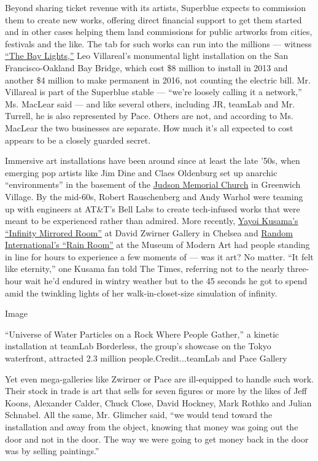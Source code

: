 Beyond sharing ticket revenue with its artists, Superblue expects to
commission them to create new works, offering direct financial support
to get them started and in other cases helping them land commissions for
public artworks from cities, festivals and the like. The tab for such
works can run into the millions --- witness
\href{https://illuminate.org/projects/the-bay-lights/}{``The Bay
Lights,''} Leo Villareal's monumental light installation on the San
Francisco-Oakland Bay Bridge, which cost \$8 million to install in 2013
and another \$4 million to make permanent in 2016, not counting the
electric bill. Mr. Villareal is part of the Superblue stable --- ``we're
loosely calling it a network,'' Ms. MacLear said --- and like several
others, including JR, teamLab and Mr. Turrell, he is also represented by
Pace. Others are not, and according to Ms. MacLear the two businesses
are separate. How much it's all expected to cost appears to be a closely
guarded secret.

Immersive art installations have been around since at least the late
'50s, when emerging pop artists like Jim Dine and Claes Oldenburg set up
anarchic ``environments'' in the basement of the
\href{https://www.judson.org/arts}{Judson Memorial Church} in Greenwich
Village. By the mid-60s, Robert Rauschenberg and Andy Warhol were
teaming up with engineers at AT\&T's Bell Labs to create tech-infused
works that were meant to be experienced rather than admired. More
recently,
\href{https://www.nytimes3xbfgragh.onion/2013/12/02/arts/design/yayoi-kusamas-mirrored-room-at-david-zwirner-gallery.html}{Yayoi
Kusama's ``Infinity Mirrored Room''} at David Zwirner Gallery in Chelsea
and
\href{https://www.nytimes3xbfgragh.onion/video/arts/design/100000002254021/rain-room-at-the-barbican-center.html}{Random
International's ``Rain Room''} at the Museum of Modern Art had people
standing in line for hours to experience a few moments of --- was it
art? No matter. ``It felt like eternity,'' one Kusama fan told The
Times, referring not to the nearly three-hour wait he'd endured in
wintry weather but to the 45 seconds he got to spend amid the twinkling
lights of her walk-in-closet-size simulation of infinity.

Image

``Universe of Water Particles on a Rock Where People Gather,'' a kinetic
installation at teamLab Borderless, the group's showcase on the Tokyo
waterfront, attracted 2.3 million people.Credit...teamLab and Pace
Gallery

Yet even mega-galleries like Zwirner or Pace are ill-equipped to handle
such work. Their stock in trade is art that sells for seven figures or
more by the likes of Jeff Koons, Alexander Calder, Chuck Close, David
Hockney, Mark Rothko and Julian Schnabel. All the same, Mr. Glimcher
said, ``we would tend toward the installation and away from the object,
knowing that money was going out the door and not in the door. The way
we were going to get money back in the door was by selling paintings.''

